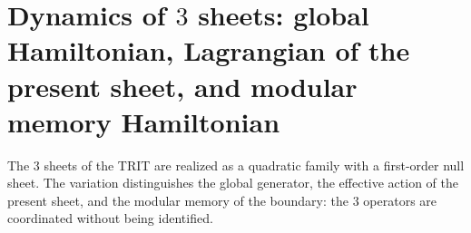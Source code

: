 \chapter{Dynamics of \texorpdfstring{\(3\)}{3} sheets: global Hamiltonian, Lagrangian of the present sheet, and modular memory Hamiltonian}
\label{chap:md-dinamica-tres-hojas-definitiva}
The \(3\) sheets of the TRIT are realized as a quadratic family with a
first-order null sheet. The variation distinguishes the global generator, the effective
action of the present sheet, and the modular memory of the boundary: the \(3\)
operators are coordinated without being identified.
\begin{HMTScientificOwnerSubordinated}

\end{HMTScientificOwnerSubordinated}
\begingroup
\let\HMTOwnerSection\section
\let\HMTOwnerSubsection\subsection
\let\HMTOwnerSubsubsection\subsubsection
\let\HMTOwnerParagraph\paragraph
\let\chapter\HMTOwnerSection
\let\section\HMTOwnerSubsection
\let\subsection\HMTOwnerSubsubsection
\let\subsubsection\HMTOwnerParagraph

\endgroup


